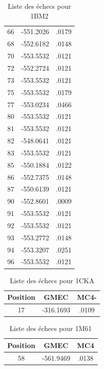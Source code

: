 \documentclass[a4paper,12pt]{article}
\begin{document}
\begin{table}[h]
\begin{tabular}{|c|c|c|}
        66 & -551.2026 & .0179 \\
        68 & -552.6182 & .0148 \\
        70 & -553.5532 & .0121 \\
        72 & -552.2724 & .0121 \\
        73 & -553.5532 & .0121 \\
        75 & -553.5532 & .0179 \\
        77 & -553.0234 & .0466 \\
        80 & -553.5532 & .0121 \\
        81 & -553.5532 & .0121 \\
        82 & -548.0641 & .0121 \\
        83 & -553.5532 & .0121 \\
        85 & -550.1884 & .0122 \\
        86 & -552.7375 & .0148 \\
        87 & -550.6139 & .0121 \\
        90 & -552.8601 & .0009 \\
        91 & -553.5532 & .0121 \\
        92 & -553.5532 & .0121 \\
        93 & -553.2772 & .0148 \\
        94 & -553.3207 & .0251 \\
        96 & -553.5532 & .0121 \\
        \hline


      \end{tabular}      
      \caption{Liste des échecs pour 1BM2}
      \label{tab_best_ener_no_active}      
    \end{table}




    \begin{table}[h]
      \centering

      \begin{tabular}{|c|c|c|}


        \hline
        Position & GMEC & MC4- \\
        \hline
        17 & -316.1693 & .0109 \\

\hline
      \end{tabular}      
      \caption{Liste des échecs pour 1CKA}
      \label{tab_echec_1CKA_1}      
    \end{table}

    \begin{table}[h]
      \centering

      \begin{tabular}{|c|c|c|}

        \hline
        \hline
        Position & GMEC & MC4 \\
        \hline
        58 & -561.9469 & .0138 \\
        
        \hline

      \end{tabular}      
      \caption{Liste des échecs pour 1M61}
      \label{tab_echec1M61__1}      
    \end{table}
    
\end{document}
